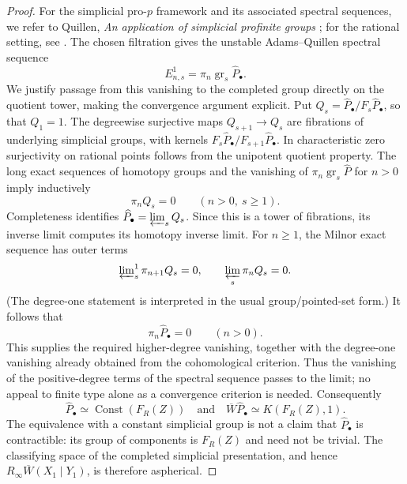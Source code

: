 \documentclass[11pt,a4paper]{article}
\begin{document}
\begin{proof}
For the simplicial pro-$p$ framework and its associated spectral
sequences, we refer to Quillen, \emph{An application of simplicial
profinite groups} \cite{QUILLEN69}; for the rational setting, see
\cite{Qui5}.  The chosen filtration gives the unstable Adams--Quillen
spectral sequence
\[
 E^1_{n,s}=\pi_n\operatorname{gr}_s\widehat P_\bullet.
\]
We justify passage from this vanishing to the completed group directly
on the quotient tower, making the convergence argument explicit.
Put $Q_s=\widehat P_\bullet/F_s\widehat P_\bullet$, so that $Q_1=1$.
The degreewise surjective maps $Q_{s+1}\to Q_s$ are fibrations of
underlying simplicial groups, with kernels
$F_s\widehat P_\bullet/F_{s+1}\widehat P_\bullet$.
In characteristic zero surjectivity on rational points follows from the
unipotent quotient property.  The long exact sequences of homotopy
groups and the vanishing of $\pi_n\operatorname{gr}_s\widehat P$ for
$n>0$ imply inductively
\[
 \pi_nQ_s=0\qquad(n>0,\ s\geq1).
\]
Completeness identifies $\widehat P_\bullet=\varprojlim_sQ_s$.
Since this is a tower of fibrations, its inverse limit computes its
homotopy inverse limit.  For $n\geq1$, the Milnor exact sequence has
outer terms
\[
 \varprojlim\nolimits_s^1\pi_{n+1}Q_s=0,
 \qquad \varprojlim_s\pi_nQ_s=0.
\]
(The degree-one statement is interpreted in the usual group/pointed-set
form.)  It follows that
\[
 \pi_n\widehat P_\bullet=0\qquad(n>0).
\]
This supplies the required higher-degree vanishing, together with the
degree-one vanishing already obtained from the cohomological criterion.
Thus the vanishing of the positive-degree terms of the spectral sequence
passes to the limit; no appeal to finite type alone as a convergence
criterion is needed.
Consequently
\[
 \widehat P_\bullet\simeq\operatorname{Const}(F_R(Z))
 \quad\text{and}\quad
 \overline W\widehat P_\bullet\simeq K(F_R(Z),1).
\]
The equivalence with a constant simplicial group is not a claim that
$\widehat P_\bullet$ is contractible: its group of components is
$F_R(Z)$ and need not be trivial.
The classifying space of the completed simplicial presentation, and hence
$R_\infty\overline W(X_1\mid Y_1)$, is therefore aspherical.
\end{proof}
\end{document}
